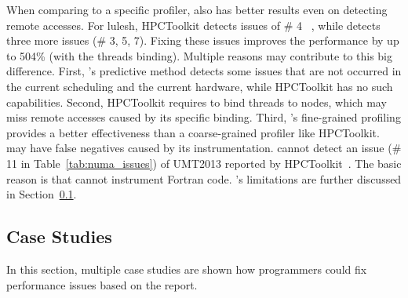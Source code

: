 When comparing to a specific profiler, \NP{} also has better results even on detecting remote accesses. For lulesh, HPCToolkit detects issues of \# 4 ~\cite{XuNuma}, while \NP{} detects three more issues (\# 3, 5, 7). Fixing these issues improves the performance by up to 504\% (with the threads binding). Multiple reasons may contribute to this big difference. 
First, \NP{}'s predictive method detects some issues that are not occurred in the current scheduling and the current hardware, while HPCToolkit has no such capabilities. Second, HPCToolkit requires to bind threads to nodes, which may miss remote accesses caused by its specific binding. 
Third, \NP{}'s fine-grained profiling provides a better effectiveness than a coarse-grained profiler like HPCToolkit. 
\NP{} may have false negatives caused by its instrumentation. \NP{} cannot detect an issue (\# 11 in Table~\ref{tab:numa_issues}) of UMT2013 reported by HPCToolkit~\cite{XuNuma}. The basic reason is that \NP{} cannot instrument Fortran code. \NP{}'s limitations are further discussed in Section~\ref{sec:casestudies}.




\subsection{Case Studies}
\label{sec:casestudies}
In this section, multiple case studies are shown how programmers could fix performance issues based on the report. 


